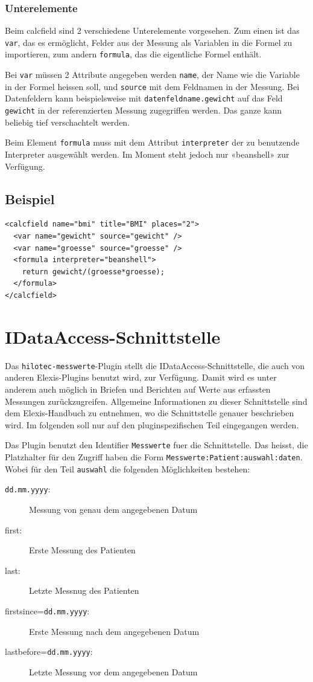 \documentclass[a4paper]{scrartcl}
\begin{document}
\subsubsection{Unterelemente}
Beim calcfield sind 2 verschiedene Unterelemente vorgesehen. Zum einen ist das
\texttt{var}, das es ermöglicht, Felder aus der Messung als Variablen in die
Formel zu importieren, zum andern \texttt{formula}, das die eigentliche Formel
enthält.

Bei \texttt{var} müssen 2 Attribute angegeben werden \texttt{name}, der
Name wie die Variable in der Formel heissen soll, und \texttt{source} mit dem
Feldnamen in der Messung. Bei Datenfeldern kann beispielsweise mit
\texttt{datenfeldname.gewicht} auf das Feld \texttt{gewicht} in der
re\-fe\-ren\-zier\-ten Messung zugegriffen werden. Das ganze kann beliebig tief
verschachtelt werden.

Beim Element \texttt{formula} muss mit dem Attribut \texttt{interpreter} der zu
benutzende Interpreter ausgewählt werden. Im Moment steht jedoch nur «beanshell»
zur Verfügung.
\subsection{Beispiel}
\begin{lstlisting}
<calcfield name="bmi" title="BMI" places="2">
  <var name="gewicht" source="gewicht" />
  <var name="groesse" source="groesse" />
  <formula interpreter="beanshell">
    return gewicht/(groesse*groesse);
  </formula>
</calcfield>
\end{lstlisting}


\section{IDataAccess-Schnittstelle}
Das \texttt{hilotec-messwerte}-Plugin stellt die IDataAccess-Schnittstelle, die
auch von an\-de\-ren Elexis-Plugins benutzt wird, zur Verfügung. Damit wird es unter
anderem auch möglich in Briefen und Berichten auf Werte aus erfassten Messungen
zurückzugreifen. Allgemeine Informationen zu dieser Schnittstelle sind dem
Elexis-Handbuch zu ent\-neh\-men, wo die Schnittstelle genauer beschrieben wird. Im
folgenden soll nur auf den plug\-in\-spe\-zi\-fi\-schen Teil eingegangen werden.

Das Plugin benutzt den Identifier \texttt{Messwerte} fuer die Schnittstelle. Das
heisst, die Platzhalter für den Zugriff haben die Form
\texttt{Messwerte:Patient:auswahl:daten}. Wobei für den Teil \texttt{auswahl} die
folgenden Möglichkeiten bestehen:
\begin{description}
    \item[\texttt{dd.mm.yyyy}:] Messung von genau dem angegebenen Datum
    \item[first:] Erste Messung des Patienten
    \item[last:] Letzte Messnug des Patienten
    \item[firstsince=\texttt{dd.mm.yyyy}:] Erste Messung nach dem angegebenen
                                           Datum
    \item[lastbefore=\texttt{dd.mm.yyyy}:] Letzte Messung vor dem angegebenen
                                           Datum
\end{description}
\end{document}
